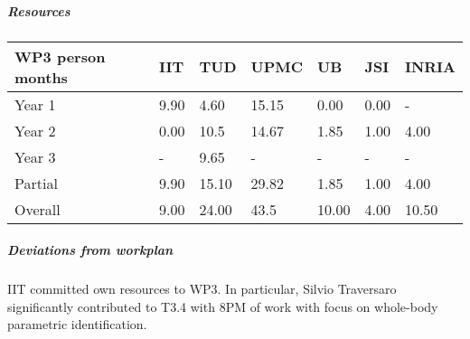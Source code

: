 
\subparagraph{Resources}

\begin{center}
\begin{tabular}{|C{1.5cm}|C{1.5cm}|C{1.5cm}|C{2cm}|C{2cm}|C{2cm}|C{2cm}|}
\hline
\footnotesize \textbf{WP3 person months} & \footnotesize \textbf{IIT}&\footnotesize \textbf{TUD}&\footnotesize \textbf{UPMC}& \footnotesize \textbf{UB} &\footnotesize \textbf{JSI} &\footnotesize \textbf{INRIA} \\ \hline
\footnotesize Year 1 &  9.90 & 4.60 & 15.15 & 0.00 & 0.00 &  -   \\  \hline
\footnotesize Year 2 &  0.00 & 10.5 & 14.67 & 1.85 & 1.00 &  4.00  \\  \hline
\footnotesize Year 3 &  -    & 9.65 & -     & -    & -    &  -     \\  \hline
\footnotesize Partial &  9.90 & 15.10 & 29.82 & 1.85 & 1.00 & 4.00 \\ \hline \hline
\footnotesize Overall &  9.00 & 24.00 & 43.5 & 10.00 & 4.00 & 10.50 \\ \hline
\end{tabular}
\end{center}

\subparagraph{Deviations from workplan} 
IIT committed own resources to WP3. In particular, Silvio Traversaro significantly contributed to T3.4 with 8PM of work with focus on whole-body parametric identification. 
